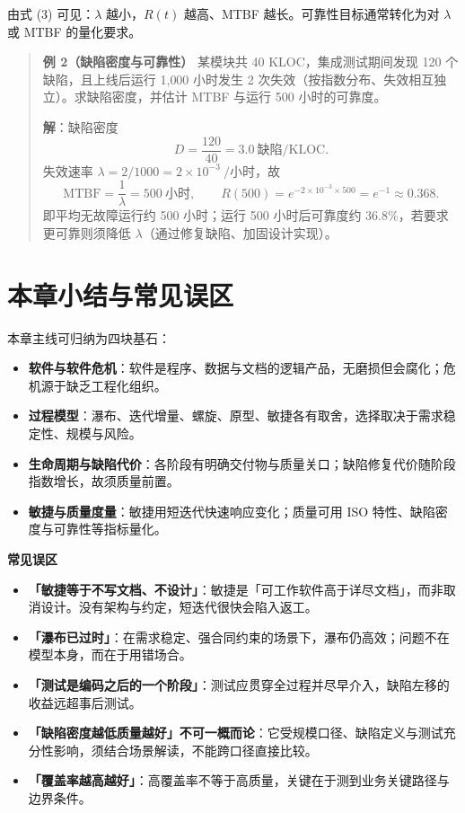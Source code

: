 \noindent 由式 (3) 可见：$\lambda$ 越小，$R(t)$ 越高、MTBF 越长。可靠性目标通常转化为对 $\lambda$ 或 MTBF 的量化要求。

\begin{quote}
\textbf{例 2（缺陷密度与可靠性）} 某模块共 40 KLOC，集成测试期间发现 120 个缺陷，且上线后运行 1{,}000 小时发生 2 次失效（按指数分布、失效相互独立）。求缺陷密度，并估计 MTBF 与运行 500 小时的可靠度。

\textbf{解}：缺陷密度
\[
D = \frac{120}{40} = 3.0\ \text{缺陷/KLOC}.
\]
失效速率 $\lambda = 2/1000 = 2\times10^{-3}\ /\text{小时}$，故
\[
\mathrm{MTBF} = \frac{1}{\lambda} = 500\ \text{小时}, \qquad
R(500) = e^{-2\times10^{-3}\times 500} = e^{-1}\approx 0.368.
\]
即平均无故障运行约 500 小时；运行 500 小时后可靠度约 $36.8\%$，若要求更可靠则须降低 $\lambda$（通过修复缺陷、加固设计实现）。
\end{quote}

\section{本章小结与常见误区}

本章主线可归纳为四块基石：

\begin{itemize}
    \item \textbf{软件与软件危机}：软件是程序、数据与文档的逻辑产品，无磨损但会腐化；危机源于缺乏工程化组织。
    \item \textbf{过程模型}：瀑布、迭代增量、螺旋、原型、敏捷各有取舍，选择取决于需求稳定性、规模与风险。
    \item \textbf{生命周期与缺陷代价}：各阶段有明确交付物与质量关口；缺陷修复代价随阶段指数增长，故须质量前置。
    \item \textbf{敏捷与质量度量}：敏捷用短迭代快速响应变化；质量可用 ISO 特性、缺陷密度与可靠性等指标量化。
\end{itemize}

\noindent\textbf{常见误区}

\begin{itemize}
    \item \textbf{「敏捷等于不写文档、不设计」}：敏捷是「可工作软件高于详尽文档」，而非取消设计。没有架构与约定，短迭代很快会陷入返工。
    \item \textbf{「瀑布已过时」}：在需求稳定、强合同约束的场景下，瀑布仍高效；问题不在模型本身，而在于用错场合。
    \item \textbf{「测试是编码之后的一个阶段」}：测试应贯穿全过程并尽早介入，缺陷左移的收益远超事后测试。
    \item \textbf{「缺陷密度越低质量越好」不可一概而论}：它受规模口径、缺陷定义与测试充分性影响，须结合场景解读，不能跨口径直接比较。
    \item \textbf{「覆盖率越高越好」}：高覆盖率不等于高质量，关键在于测到业务关键路径与边界条件。
\end{itemize}
